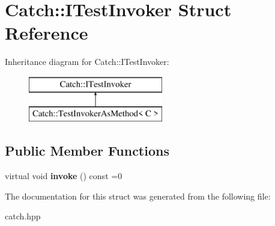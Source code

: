 \hypertarget{structCatch_1_1ITestInvoker}{}\section{Catch\+::I\+Test\+Invoker Struct Reference}
\label{structCatch_1_1ITestInvoker}
Inheritance diagram for Catch\+::I\+Test\+Invoker\+:\begin{figure}[H]
\begin{center}
\leavevmode
\includegraphics[height=2.000000cm]{structCatch_1_1ITestInvoker}
\end{center}
\end{figure}
\subsection*{Public Member Functions}
\begin{DoxyCompactItemize}
\item 
\mbox{\label{structCatch_1_1ITestInvoker_a6fcd5c5b67d6d5ade6491ff33411ca7f}} 
virtual void {\bfseries invoke} () const =0
\end{DoxyCompactItemize}


The documentation for this struct was generated from the following file\+:\begin{DoxyCompactItemize}
\item 
catch.\+hpp\end{DoxyCompactItemize}
